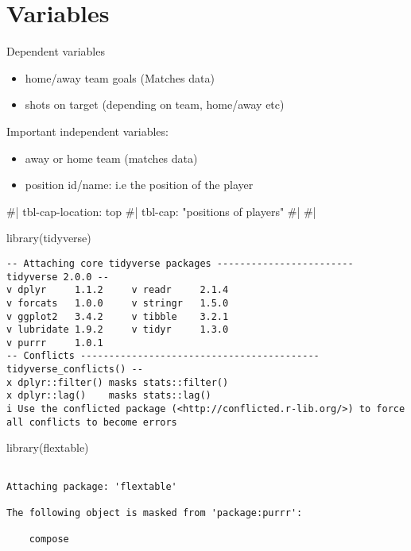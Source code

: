 \documentclass[
  letterpaper,
  DIV=11,
  numbers=noendperiod]{scrartcl}
\newenvironment{Shaded}{\begin{snugshade}}{\end{snugshade}}
\newcommand{\CommentTok}[1]{\textcolor[rgb]{0.37,0.37,0.37}{#1}}
\newcommand{\FunctionTok}[1]{\textcolor[rgb]{0.28,0.35,0.67}{#1}}
\newcommand{\NormalTok}[1]{\textcolor[rgb]{0.00,0.23,0.31}{#1}}
\providecommand{\tightlist}{%
  \setlength{\itemsep}{0pt}\setlength{\parskip}{0pt}}\usepackage{longtable,booktabs,array}
\begin{document}
\hypertarget{variables}{%
\section{Variables}\label{variables}}

Dependent variables

\begin{itemize}
\tightlist
\item
  home/away team goals (Matches data)
\item
  shots on target (depending on team, home/away etc)
\end{itemize}

Important independent variables:

\begin{itemize}
\tightlist
\item
  away or home team (matches data)
\item
  position id/name: i.e the position of the player
\end{itemize}

\begin{Shaded}
\begin{Highlighting}[]
\CommentTok{\#| tbl{-}cap{-}location: top}
\CommentTok{\#| tbl{-}cap: "positions of players"}
\CommentTok{\#| }
\CommentTok{\#| }

\FunctionTok{library}\NormalTok{(tidyverse)}
\end{Highlighting}
\end{Shaded}

\begin{verbatim}
-- Attaching core tidyverse packages ------------------------ tidyverse 2.0.0 --
v dplyr     1.1.2     v readr     2.1.4
v forcats   1.0.0     v stringr   1.5.0
v ggplot2   3.4.2     v tibble    3.2.1
v lubridate 1.9.2     v tidyr     1.3.0
v purrr     1.0.1     
-- Conflicts ------------------------------------------ tidyverse_conflicts() --
x dplyr::filter() masks stats::filter()
x dplyr::lag()    masks stats::lag()
i Use the conflicted package (<http://conflicted.r-lib.org/>) to force all conflicts to become errors
\end{verbatim}

\begin{Shaded}
\begin{Highlighting}[]
\FunctionTok{library}\NormalTok{(flextable)}
\end{Highlighting}
\end{Shaded}

\begin{verbatim}

Attaching package: 'flextable'

The following object is masked from 'package:purrr':

    compose
\end{verbatim}
\end{document}
